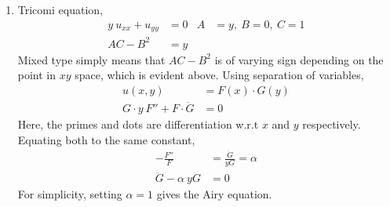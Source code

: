 \begin{enumerate}
    \item Tricomi equation,
          \begin{align}
              y\ u_{xx} + u_{yy} & = 0                 &
              A                  & = y,\ B = 0,\ C = 1   \\
              AC - B^2           & = y
          \end{align}
          Mixed type simply means that $ AC - B^2 $ is of varying sign depending on the
          point in $ xy $ space, which is evident above. Using separation of variables,
          \begin{align}
              u(x,y)                            & = F(x) \cdot G(y) \\
              G \cdot y\ F'' + F \cdot \ddot{G} & = 0
          \end{align}
          Here, the primes and dots are differentiation w.r.t $ x $ and $ y $
          respectively. Equating both to the same constant,
          \begin{align}
              -\frac{F''}{F}        & = \frac{\ddot{G}}{yG} = \alpha \\
              \ddot{G} - \alpha\ yG & = 0
          \end{align}
          For simplicity, setting $ \alpha = 1 $ gives the Airy equation.
\end{enumerate}